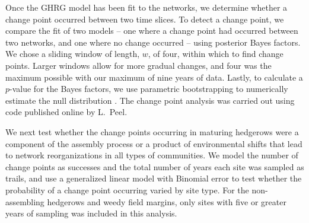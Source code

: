 \documentclass[12pt]{article}
\begin{document}
Once the GHRG model has been fit to the networks, we determine whether
a change point occurred between two time slices. To detect a change
point, we compare the fit of two models -- one where a change point
had occurred between two networks, and one where no change occurred --
using posterior Bayes factors. We chose a sliding window of length,
$w$, of four, within which to find change points. Larger windows allow
for more gradual changes, and four was the maximum possible with our
maximum of nine years of data. Lastly, to calculate a $p$-value for
the Bayes factors, we use parametric bootstrapping to numerically
estimate the null distribution \citep{peel2014detecting}. The change
point analysis was carried out using code published online by L.~Peel.

We next test whether the change points occurring in maturing hedgerows
were a component of the assembly process or a product of environmental
shifts that lead to network reorganizations in all types of
communities. We model the number of change points as successes and the
total number of years each site was sampled as trails, and use a
generalized linear model with Binomial error to test whether the
probability of a change point occurring varied by site type. For the
non-assembling hedgerows and weedy field margins, only sites with five
or greater years of sampling was included in this analysis.




\end{document}

